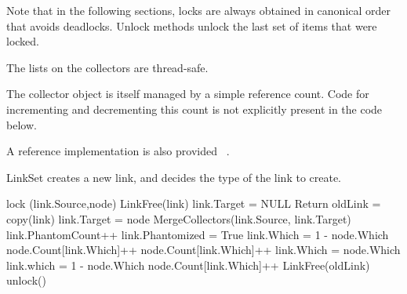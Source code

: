 Note that in the following sections, locks are always obtained in canonical order that avoids deadlocks. Unlock methods unlock the last set of items that were locked.

The lists on the collectors are thread-safe.

The collector object is itself managed by a simple reference count. Code for incrementing and decrementing this count is not explicitly present in the code below.

A reference implementation is also provided ~\cite{url:refimpl}.

\begin{algorithm}[H]
		\scriptsize
			\caption{LinkSet creates a new link,
				and decides the type of the link to create.}
			\label{single:algorithm:linkset}
			
					\begin{algorithmic}[1]
		
\State lock (link.Source,node)
\State LinkFree(link)
\State link.Target = NULL
\EndIf
{}
\State Return
\EndIf
\State oldLink = copy(link) 
\State link.Target = node
\State MergeCollectors(link.Source, link.Target)
\State link.PhantomCount++
\State link.Phantomized = True
\State link.Which = 1 - node.Which
\State node.Count[link.Which]++
\State node.Count[link.Which]++
\State link.Which = node.Which
\Else
\State link.which = 1 - node.Which
\State node.Count[link.Which]++
\EndIf
{}
\State LinkFree(oldLink)
\EndIf
\State unlock()
\EndProcedure
\end{algorithmic}
\end{algorithm}
\setlength{\textfloatsep}{0pt}

